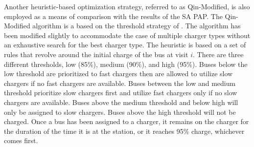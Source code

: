 \documentclass[11pt,a4paper,final]{article}
\begin{document}
Another heuristic-based optimization strategy, referred to as Qin-Modified, is also employed as a means of comparison
with the results of the SA PAP. The Qin-Modified algorithm is a based on the threshold strategy of
\cite{qin-2016-numer-analy}. The algorithm has been modified slightly to accommodate the case of multiple charger types
without an exhaustive search for the best charger type. The heuristic is based on a set of rules that revolve around the
initial charge of the bus at visit \(i\). There are three different thresholds, low (85\%), medium (90\%), and high (95\%).
Buses below the low threshold are prioritized to fast chargers then are allowed to utilize slow chargers if no fast
chargers are available. Buses between the low and medium threshold prioritize slow chargers first and utilize fast
chargers only if no slow chargers are available. Buses above the medium threshold and below high will only be assigned
to slow chargers. Buses above the high threshold will not be charged. Once a bus has been assigned to a charger, it
remains on the charger for the duration of the time it is at the station, or it reaches 95\% charge, whichever comes
first.
\end{document}
